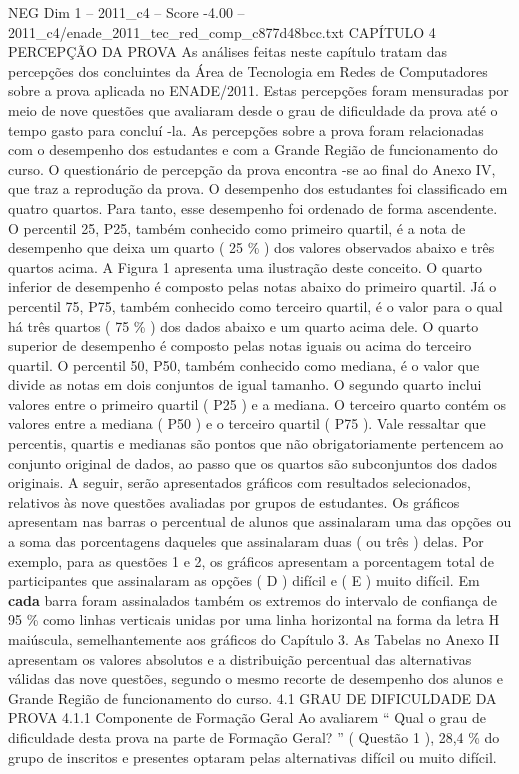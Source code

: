 \begin{textsample}{NEG Dim 1 – 2011\_c4 – Score -4.00 – 2011\_c4/enade\_2011\_tec\_red\_comp\_c877d48bcc.txt}  \label{ex:f1_neg_115}
CAPÍTULO 4 PERCEPÇÃO DA PROVA As análises feitas neste capítulo tratam das percepções dos concluintes da Área de Tecnologia em Redes de Computadores sobre a prova aplicada no ENADE/2011.
Estas percepções foram mensuradas por meio de nove questões que avaliaram desde o grau de dificuldade da prova até o tempo gasto para concluí -la.
As percepções sobre a prova foram relacionadas com o desempenho dos estudantes e com a Grande Região de funcionamento do curso.
O questionário de percepção da prova encontra -se ao final do Anexo IV, que traz a reprodução da prova.
O desempenho dos estudantes foi classificado em quatro quartos.
Para tanto, esse desempenho foi ordenado de forma ascendente.
O percentil 25, P25, também conhecido como primeiro quartil, é a nota de desempenho que deixa um quarto ( 25 \% ) dos valores observados abaixo e três quartos acima.
A Figura 1 apresenta uma ilustração deste conceito.
O quarto inferior de desempenho é composto pelas notas abaixo do primeiro quartil.
Já o percentil 75, P75, também conhecido como terceiro quartil, é o valor para o qual há três quartos ( 75 \% ) dos dados abaixo e um quarto acima dele.
O quarto superior de desempenho é composto pelas notas iguais ou acima do terceiro quartil.
O percentil 50, P50, também conhecido como mediana, é o valor que divide as notas em dois conjuntos de igual tamanho.
O segundo quarto inclui valores entre o primeiro quartil ( P25 ) e a mediana.
O terceiro quarto contém os valores entre a mediana ( P50 ) e o terceiro quartil ( P75 ).
Vale ressaltar que percentis, quartis e medianas são pontos que não obrigatoriamente pertencem ao conjunto original de dados, ao passo que os quartos são subconjuntos dos dados originais.
A seguir, serão apresentados gráficos com resultados selecionados, relativos às nove questões avaliadas por grupos de estudantes.
Os gráficos apresentam nas barras o percentual de alunos que assinalaram uma das opções ou a soma das porcentagens daqueles que assinalaram duas ( ou três ) delas.
Por exemplo, para as questões 1 e 2, os gráficos apresentam a porcentagem total de participantes que assinalaram as opções ( D ) difícil e ( E ) muito difícil.
Em \textbf{cada} barra foram assinalados também os extremos do intervalo de confiança de 95 \% como linhas verticais unidas por uma linha horizontal na forma da letra H maiúscula, semelhantemente aos gráficos do Capítulo 3.
As Tabelas no Anexo II apresentam os valores absolutos e a distribuição percentual das alternativas válidas das nove questões, segundo o mesmo recorte de desempenho dos alunos e Grande Região de funcionamento do curso. 4.1 GRAU DE DIFICULDADE DA PROVA 4.1.1 Componente de Formação Geral Ao avaliarem “ Qual o grau de dificuldade desta prova na parte de Formação Geral? ” ( Questão 1 ), 28,4 \% do grupo de inscritos e presentes optaram pelas alternativas difícil ou muito difícil.

\end{textsample}
